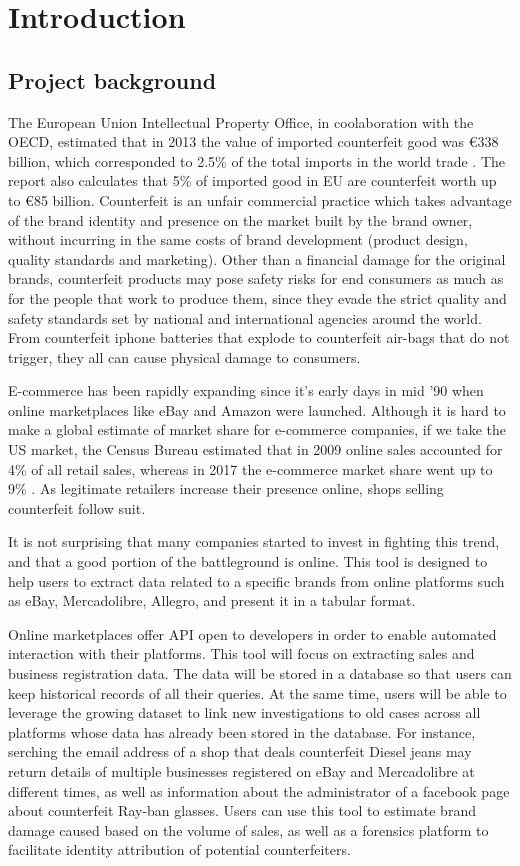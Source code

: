 \chapter{Introduction}

\section{Project background}
The European Union Intellectual Property Office, in coolaboration with the
OECD, estimated that in 2013 the value of imported counterfeit good was
\euro338 billion, which corresponded to 2.5\% of the total imports in the world
trade \cite{OE16}. The report also calculates that 5\% of imported good in EU
are counterfeit worth up to \euro85 billion. Counterfeit is an unfair commercial
practice which takes advantage of the brand identity and presence on the market built by the brand
owner, without incurring in the same costs of brand development (product design,
quality standards and marketing). Other than a financial damage for the original
brands, counterfeit products may pose safety risks for end consumers as much as
for the people that work to produce them, since they evade the strict quality
and safety standards set by national and international agencies around the
world. From counterfeit iphone batteries that explode to counterfeit air-bags
that do not trigger, they all can cause physical damage to consumers.

E-commerce has been rapidly expanding since it's early days in mid '90 when
online marketplaces like eBay and Amazon were launched. Although it is hard to
make a global estimate of market share for e-commerce companies, if we take the
US market, the Census Bureau estimated that in 2009 online sales accounted for
4\% of all retail sales, whereas in 2017 the e-commerce market share went up to
9\% \cite{USDC18}. As legitimate retailers increase their presence online,
shops selling counterfeit follow suit.

It is not surprising that many companies started to invest in fighting this
trend, and that a good portion of the battleground is online. This tool is
designed to help users to extract data related to a specific brands from online
platforms such as eBay, Mercadolibre, Allegro, and present it in a tabular
format.

Online marketplaces offer API open to developers in order to enable automated
interaction with their platforms. This tool will focus on extracting sales and
business registration data. The data will be stored in a database so that users
can keep historical records of all their queries. At the same time, users will
be able to leverage the growing dataset to link new investigations to old cases
across all platforms whose data has already been stored in the database. For
instance, serching the email address of a shop that deals counterfeit Diesel
jeans may return details of multiple businesses registered on eBay and
Mercadolibre at different times, as well as information about the administrator
of a facebook page about counterfeit Ray-ban glasses. Users can use this tool to
estimate brand damage caused based on the volume of sales, as well as a
forensics platform to facilitate identity attribution of potential
counterfeiters.

